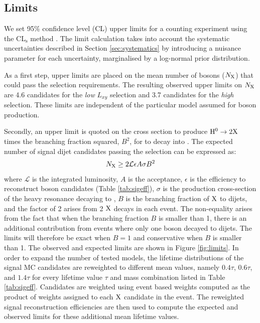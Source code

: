 \subsection{Limits}
\label{subsec:limits}

We set 95\% confidence level
(CL) upper limits for a counting experiment
using the CL$_\mathrm{s}$ method \cite{Read:2002hq, Junk:1999kv}. The limit calculation
takes into account the systematic uncertainties described in Section \ref{sec:systematics} by introducing
a nuisance parameter for each uncertainty, marginalised by a log-normal prior distribution.

As a first step, upper limits are placed on the mean number of \X bosons ($N_\mathrm{X}$) that could pass
the selection requirements. The resulting observed upper limits on $N_\mathrm{X}$ are 4.6 candidates
for the {\it low} $L_{xy}$ selection and 3.7 candidates for the {\it high} selection.
 These limits are independent
of the particular model assumed for \X boson production.


Secondly, an upper limit is quoted on the cross section
to produce $\Higgs \to 2\X$ times the branching fraction squared, $B^2$, for \X to decay into \qq.
The expected number of signal dijet candidates passing the selection can be expressed as:
\begin{equation}
N_\mathrm{X} \geq 2 \mathcal{L}\epsilon A\sigma B^2
\end{equation}
where $\mathcal{L}$ is the integrated luminosity, $A$ is the acceptance,
$\epsilon$ is the efficiency to reconstruct \X boson candidates
(Table \ref{tab:sigeff}), $\sigma$ is the production cross-section of the heavy resonance decaying to \X,
$B$ is the branching fraction of $\mathrm{X}$ to dijets, and the factor of 2 arises from 2 $\mathrm{X}$ decays in each event.
 The non-equality arises from the fact that when the branching
fraction $B$
is smaller than 1, there is an additional contribution from events where only one \X boson decayed to dijets.
The limits will therefore be exact when $B=1$ and conservative when $B$ is smaller than 1.
The observed and
expected limits are shown in Figure \ref{fig:limits}. In order to expand the number of tested models,
the lifetime distributions of the signal MC candidates are reweighted to
different mean values, namely $0.4\tau$, $0.6\tau$, and $1.4\tau$ for every
lifetime value $\tau$ and mass combination listed
in Table \ref{tab:sigeff}.
Candidates are weighted using event based weights computed as the product
 of weights assigned to each $\mathrm{X}$ candidate in the event.
The reweighted signal reconstruction efficiencies are then used
to compute the expected and observed limits for these additional mean lifetime values.

